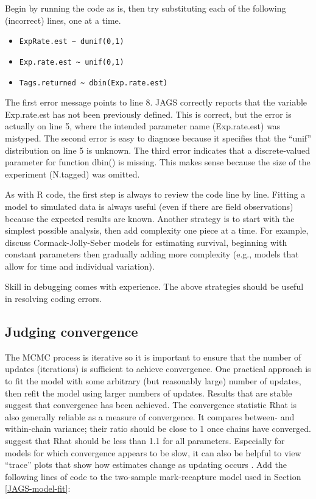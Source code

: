 \documentclass[
]{krantz}
\providecommand{\tightlist}{%
  \setlength{\itemsep}{0pt}\setlength{\parskip}{0pt}}
\begin{document}
Begin by running the code as is, then try substituting each of the following (incorrect) lines, one at a time.

\begin{itemize}
\tightlist
\item
  \texttt{ExpRate.est\ \textasciitilde{}\ dunif(0,1)}
\item
  \texttt{Exp.rate.est\ \textasciitilde{}\ unif(0,1)}
\item
  \texttt{Tags.returned\ \textasciitilde{}\ dbin(Exp.rate.est)}
\end{itemize}

The first error message points to line 8. JAGS correctly reports that the variable Exp.rate.est has not been previously defined. This is correct, but the error is actually on line 5, where the intended parameter name (Exp.rate.est) was mistyped. The second error is easy to diagnose because it specifies that the ``unif'' distribution on line 5 is unknown. The third error indicates that a discrete-valued parameter for function dbin() is missing. This makes sense because the size of the experiment (N.tagged) was omitted.

As with R code, the first step is always to review the code line by line. Fitting a model to simulated data is always useful (even if there are field observations) because the expected results are known. Another strategy is to start with the simplest possible analysis, then add complexity one piece at a time. For example, \citet{kéry.schaub_2011} discuss Cormack-Jolly-Seber models for estimating survival, beginning with constant parameters then gradually adding more complexity (e.g., models that allow for time and individual variation).

Skill in debugging comes with experience. The above strategies should be useful in resolving coding errors.

\hypertarget{Convergence}{%
\subsection{Judging convergence}\label{Convergence}}

The MCMC process is iterative so it is important to ensure that the number of updates (iterations) is sufficient to achieve convergence. One practical approach is to fit the model with some arbitrary (but reasonably large) number of updates, then refit the model using larger numbers of updates. Results that are stable suggest that convergence has been achieved. The convergence statistic Rhat \citep{gelman.rubin1992, brooks.gelman1998, lunn.etal2012} is also generally reliable as a measure of convergence. It compares between- and within-chain variance; their ratio should be close to 1 once chains have converged. \citet{gelman.hill_2006} suggest that Rhat should be less than 1.1 for all parameters. Especially for models for which convergence appears to be slow, it can also be helpful to view ``trace'' plots that show how estimates change as updating occurs \citep{kéry_2010}. Add the following lines of code to the two-sample mark-recapture model used in Section \ref{JAGS-model-fit}:
\end{document}

